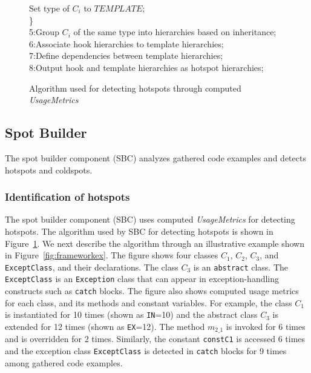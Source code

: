 \documentclass[conference]{IEEEtran}
\newcommand{\CodeIn}[1]{{\small\texttt{#1}}}
\newenvironment{CodeOut}{\begin{small}}{\end{small}}
\begin{document}
\begin{figure}[t]
\begin{CodeOut}
\hspace*{0.5in}Set type of $C_i$ to $TEMPLATE$;\\
\hspace*{0.2in}\}\\
5:Group $C_i$ of the same type into hierarchies based on inheritance;\\
6:Associate hook hierarchies to template hierarchies;\\
7:Define dependencies between template hierarchies;\\
8:Output hook and template hierarchies as hotspot hierarchies;\\
\end{CodeOut}
\caption{\small{Algorithm used for detecting hotspots through computed
\emph{UsageMetrics}}} \label{alg:hotspotalgo}
\end{figure}
\subsection{Spot Builder} 
The spot builder component (SBC) analyzes gathered code examples and detects 
hotspots and coldspots.
\subsubsection{Identification of hotspots}
The spot builder component (SBC) uses computed \emph{UsageMetrics} for
detecting hotspots. The algorithm used by SBC for detecting hotspots
is shown in Figure~\ref{alg:hotspotalgo}. We next describe the algorithm 
through an illustrative example shown in Figure~\ref{fig:frameworkex}. The figure
shows four classes $C_1$, $C_2$, $C_3$, and \CodeIn{ExceptClass}, and their declarations. 
The class $C_3$ is an \CodeIn{abstract} class. The \CodeIn{ExceptClass}
is an \CodeIn{Exception} class that can appear in exception-handling
constructs such as \CodeIn{catch} blocks. The figure also shows
computed usage metrics for each class, and its methods and constant variables. For example,
the class $C_1$ is instantiated for 10 times (shown as \CodeIn{IN}=10)
and the abstract class $C_3$ is extended for 12 times (shown as \CodeIn{EX}=12). 
The method $m_{2\_1}$ is invoked for 6 times and is overridden for 2 times.
Similarly, the constant \CodeIn{constC1} is accessed 6 times and the 
exception class \CodeIn{ExceptClass} is detected in \CodeIn{catch} blocks
for 9 times among gathered code examples.
\end{document}
